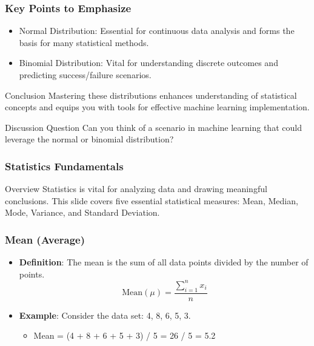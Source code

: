 \documentclass[aspectratio=169]{beamer}
\begin{document}
\begin{frame}[fragile]
    \frametitle{Key Points to Emphasize}
    \begin{itemize}
        \item Normal Distribution: Essential for continuous data analysis and forms the basis for many statistical methods.
        \item Binomial Distribution: Vital for understanding discrete outcomes and predicting success/failure scenarios.
    \end{itemize}
    \begin{block}{Conclusion}
        Mastering these distributions enhances understanding of statistical concepts and equips you with tools for effective machine learning implementation.
    \end{block}
    \begin{block}{Discussion Question}
        Can you think of a scenario in machine learning that could leverage the normal or binomial distribution?
    \end{block}
\end{frame}

\begin{frame}[fragile]
    \frametitle{Statistics Fundamentals}
    \begin{block}{Overview}
        Statistics is vital for analyzing data and drawing meaningful conclusions. This slide covers five essential statistical measures: Mean, Median, Mode, Variance, and Standard Deviation.
    \end{block}
\end{frame}

\begin{frame}[fragile]
    \frametitle{Mean (Average)}
    \begin{itemize}
        \item \textbf{Definition}: The mean is the sum of all data points divided by the number of points.
        \begin{equation}
            \text{Mean} (\mu) = \frac{\sum_{i=1}^{n} x_i}{n}
        \end{equation}
        \item \textbf{Example}: Consider the data set: 4, 8, 6, 5, 3.
        \begin{itemize}
            \item Mean = (4 + 8 + 6 + 5 + 3) / 5 = 26 / 5 = 5.2
        \end{itemize}
    \end{itemize}
\end{frame}
\end{document}
